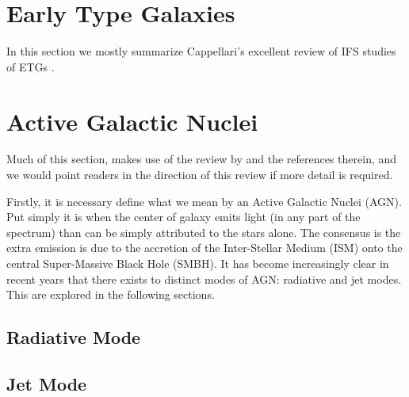 \section{Early Type Galaxies}
	\label{sec:introETG}
	In this section we mostly summarize Cappellari's excellent review of IFS studies of ETGs \citep{Cappellari2016}. 



\section{Active Galactic Nuclei}
	\label{sec:introAGN}
	Much of this section, makes use of the review by \citet{Heckman2014} and the references therein, and we would point readers in the direction of this review if more detail is required. 

	Firstly, it is necessary define what we mean by an Active Galactic Nuclei (AGN). Put simply it is when the center of galaxy emits light (in any part of the spectrum) than can be simply attributed to the stars alone. The consensus is the extra emission is due to the accretion of the Inter-Stellar Medium (ISM) onto the central Super-Massive Black Hole (SMBH). It has become increasingly clear in recent years that there exists to distinct modes of AGN: radiative and jet modes. This are explored in the following sections.

	\subsection{Radiative Mode}
		\label{subsec:introRadiative}

	\subsection{Jet Mode}
		\label{subsec:introJet}
